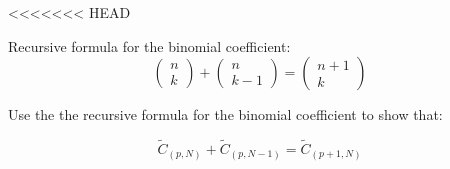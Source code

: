 <<<<<<< HEAD
\begin{frame}
Recursive formula for the binomial coefficient:
\begin{equation}
			\left( \begin{array}{c}
			n\\
			k
			\end{array}\right)+
			\left( \begin{array}{c}
			n\\
			k-1
			\end{array}\right)=
			\left( \begin{array}{c}
			n+1\\
			k
			\end{array}\right)
\end{equation}

Use the the recursive formula for the binomial coefficient to show that:

\begin{equation}
\tilde C_{(p,N)}+\tilde C_{(p,N-1)}=\tilde C_{(p+1,N)}
\end{equation}

\end{frame}

